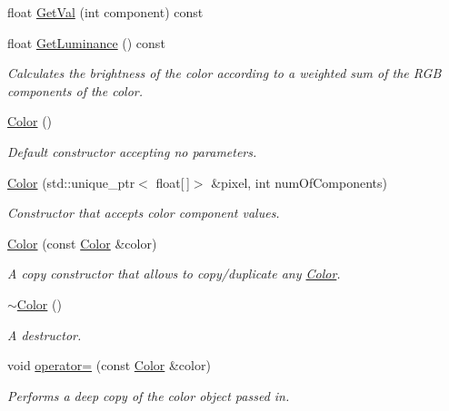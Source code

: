 \begin{DoxyCompactItemize}
float \hyperlink{classColor_ae8aa52d3ec0bb13f4f9732d9487a5431}{Get\+Val} (int component) const
\item 
float \hyperlink{classColor_a196417267fdde68255f53164c5eff701}{Get\+Luminance} () const
\begin{DoxyCompactList}\small\item\em Calculates the brightness of the color according to a weighted sum of the R\+GB components of the color. \end{DoxyCompactList}\item 
\mbox{\label{classColor_a9a742cbe9f9f4037f5d9f4e81a9b2428}} 
\hyperlink{classColor_a9a742cbe9f9f4037f5d9f4e81a9b2428}{Color} ()
\begin{DoxyCompactList}\small\item\em Default constructor accepting no parameters. \end{DoxyCompactList}\item 
\hyperlink{classColor_a18c0e82aae9dfe069aea5d2326ee4b4b}{Color} (std\+::unique\+\_\+ptr$<$ float\mbox{[}$\,$\mbox{]}$>$ \&pixel, int num\+Of\+Components)
\begin{DoxyCompactList}\small\item\em Constructor that accepts color component values. \end{DoxyCompactList}\item 
\hyperlink{classColor_a7b075d27e3bbdde7cbe648dc3b804261}{Color} (const \hyperlink{classColor}{Color} \&color)
\begin{DoxyCompactList}\small\item\em A copy constructor that allows to copy/duplicate any \hyperlink{classColor}{Color}. \end{DoxyCompactList}\item 
\mbox{\label{classColor_a3cfce6c6821d3bf489e26074c55378c0}} 
\hyperlink{classColor_a3cfce6c6821d3bf489e26074c55378c0}{$\sim$\+Color} ()
\begin{DoxyCompactList}\small\item\em A destructor. \end{DoxyCompactList}\item 
void \hyperlink{classColor_ac06dcf409ae64de5a67c7f6e69b6f44b}{operator=} (const \hyperlink{classColor}{Color} \&color)
\begin{DoxyCompactList}\small\item\em Performs a deep copy of the color object passed in. \end{DoxyCompactList}\item 

\end{DoxyCompactItemize}
